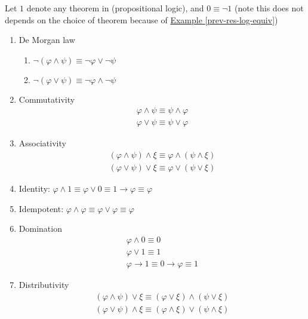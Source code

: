 \documentclass{treatise}
\begin{document}
\begin{proposition} \label{logic-propositional-properties}
Let $1$ denote any theorem in (propositional logic), and $0 \equiv \neg 1$ (note this does not depends on the choice of theorem because of \hyperref[prev-res-log-equiv]{Example \ref*{prev-res-log-equiv}})
\begin{enumerate}
    \item De Morgan law
    \begin{enumerate}
        \item $\neg(\varphi \wedge \psi) \equiv \neg \varphi \vee \neg \psi$
        \item $\neg(\varphi \vee \psi) \equiv \neg \varphi \wedge \neg \psi$
    \end{enumerate}
    \item Commutativity
    \begin{gather*}
        \varphi \wedge \psi \equiv \psi \wedge \varphi
        \\
        \varphi \vee \psi \equiv \psi \vee \varphi
    \end{gather*}
    \item Associativity
    \begin{gather*}
        (\varphi \wedge \psi) \wedge \xi \equiv \varphi \wedge (\psi \wedge \xi)
        \\
        (\varphi \vee \psi) \vee \xi \equiv \varphi \vee (\psi \vee \xi)
    \end{gather*}
    \item Identity: $\varphi \wedge 1 \equiv \varphi \vee 0 \equiv 1 \to \varphi \equiv \varphi$
    \item Idempotent: $\varphi \wedge \varphi \equiv \varphi \vee \varphi \equiv \varphi$
    \item Domination
    \begin{gather*}
        \varphi \wedge 0 \equiv 0
        \\
        \varphi \vee 1 \equiv 1
        \\
        \varphi \to 1 \equiv 0 \to \varphi \equiv 1
    \end{gather*}
    \item Distributivity
    \begin{gather*}
        (\varphi \wedge \psi) \vee \xi \equiv (\varphi \vee \xi) \wedge (\psi \vee \xi)
        \\
        (\varphi \vee \psi) \wedge \xi \equiv (\varphi \wedge \xi) \vee (\psi \wedge \xi)
    \end{gather*}

\end{enumerate}
\end{proposition}
\end{document}
